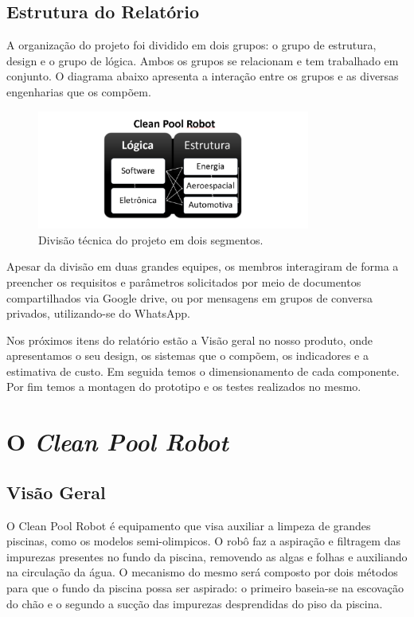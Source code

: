 \section{Estrutura do Relatório}
A organização do projeto foi dividido em dois grupos: o grupo de estrutura, design e o grupo de lógica. Ambos os grupos se relacionam e tem trabalhado em conjunto. O diagrama abaixo apresenta a interação entre os grupos e as diversas engenharias que os compõem.
\par
  \begin{figure}[h]
    \centering
    \includegraphics[width=0.8\textwidth]{figures/technical-div-project.png}
    \caption{Divisão técnica do projeto em dois segmentos.}
    \label{fig:technical-div-project}
  \end{figure}
  \FloatBarrier
\par
Apesar da divisão em duas grandes equipes, os membros interagiram de forma a preencher os requisitos e parâmetros solicitados por meio de documentos compartilhados via Google drive, ou por mensagens em grupos de conversa privados, utilizando-se do WhatsApp.

Nos próximos itens do relatório estão a Visão geral no nosso produto, onde apresentamos o seu design, os sistemas que o compõem, os indicadores e a estimativa de custo. Em seguida temos o dimensionamento de cada componente. Por fim temos a montagen do prototipo e os testes realizados no mesmo.

\chapter{O \textit{Clean Pool Robot}}
\section{Visão Geral}
O Clean Pool Robot é equipamento que visa auxiliar a limpeza de grandes piscinas, como os modelos semi-olimpicos. O robô faz a aspiração e filtragem das impurezas presentes no fundo da piscina, removendo as algas e folhas e auxiliando na circulação da água. O mecanismo do mesmo será composto por dois métodos para que o fundo da piscina possa ser aspirado: o primeiro baseia-se na escovação do chão e o segundo a sucção das impurezas desprendidas do piso da piscina.

